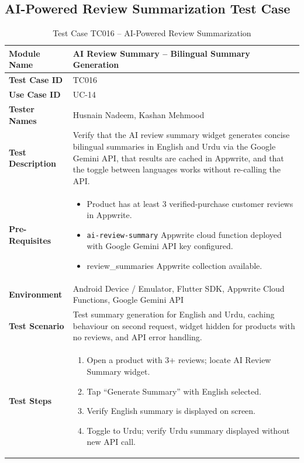 \newpage
\subsection{AI-Powered Review Summarization Test Case}

\begin{table}[H]
\centering
\caption{Test Case TC016 -- AI-Powered Review Summarization}
\label{tab:tc016}
\renewcommand{\arraystretch}{1.15}
\small
\begin{tabular}{|p{3.2cm}|p{10.8cm}|}
\hline
\textbf{Module Name} & AI Review Summary -- Bilingual Summary Generation \\ \hline
\textbf{Test Case ID} & TC016 \\ \hline
\textbf{Use Case ID} & UC-14 \\ \hline
\textbf{Tester Names} & Husnain Nadeem, Kashan Mehmood \\ \hline
\textbf{Test Description} & Verify that the AI review summary widget generates concise bilingual summaries in English and Urdu via the Google Gemini API, that results are cached in Appwrite, and that the toggle between languages works without re-calling the API. \\ \hline
\textbf{Pre-Requisites} &
\begin{itemize}[leftmargin=*,noitemsep]
\item Product has at least 3 verified-purchase customer reviews in Appwrite.
\item \texttt{ai-review-summary} Appwrite cloud function deployed with Google Gemini API key configured.
\item review\_summaries Appwrite collection available.
\end{itemize} \\ \hline
\textbf{Environment} & Android Device / Emulator, Flutter SDK, Appwrite Cloud Functions, Google Gemini API \\ \hline
\textbf{Test Scenario} & Test summary generation for English and Urdu, caching behaviour on second request, widget hidden for products with no reviews, and API error handling. \\ \hline
\textbf{Test Steps} &
\begin{enumerate}[leftmargin=*,noitemsep]
\item Open a product with 3+ reviews; locate AI Review Summary widget.
\item Tap ``Generate Summary'' with English selected.
\item Verify English summary is displayed on screen.
\item Toggle to Urdu; verify Urdu summary displayed without new API call.

\end{enumerate}
\end{tabular}
\end{table}
